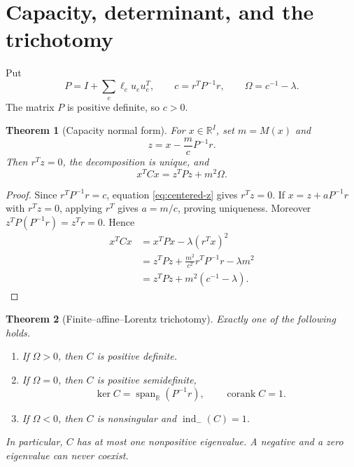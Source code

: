 \documentclass[11pt,a4paper]{amsart}
\theoremstyle{plain}
\newtheorem{theorem}{Theorem}[section]
\theoremstyle{definition}
\newcommand{\RR}{\mathbb R}
\newcommand{\corank}{\operatorname{corank}}
\newcommand{\indm}{\operatorname{ind}_{-}}
\newcommand{\spanr}{\operatorname{span}_{\RR}}
\begin{document}
\section{Capacity, determinant, and the trichotomy}\label{sec:capacity}

Put
\begin{equation}\label{eq:P-c-Omega}
 P=I+\sum_e\ell_eu_eu_e^T,\qquad
 c=r^TP^{-1}r,\qquad
 \Omega=c^{-1}-\lambda.
\end{equation}
The matrix $P$ is positive definite, so $c>0$.

\begin{theorem}[Capacity normal form]\label{thm:capacity-normal}
For $x\in\RR^I$, set $m=M(x)$ and
\begin{equation}\label{eq:centered-z}
 z=x-\frac{m}{c}P^{-1}r.
\end{equation}
Then $r^Tz=0$, the decomposition is unique, and
\begin{equation}\label{eq:capacity-completion}
 \boxed{\quad x^TCx=z^TPz+m^2\Omega.\quad}
\end{equation}
\end{theorem}

\begin{proof}
Since $r^TP^{-1}r=c$, equation \eqref{eq:centered-z} gives $r^Tz=0$.  If
$x=z+aP^{-1}r$ with $r^Tz=0$, applying $r^T$ gives $a=m/c$, proving uniqueness.  Moreover
$z^TP(P^{-1}r)=z^Tr=0$.  Hence
\begin{align*}
 x^TCx
 &=x^TPx-\lambda(r^Tx)^2\\
 &=z^TPz+\frac{m^2}{c^2}r^TP^{-1}r-\lambda m^2\\
 &=z^TPz+m^2(c^{-1}-\lambda).
\end{align*}
\end{proof}

\begin{theorem}[Finite--affine--Lorentz trichotomy]\label{thm:trichotomy}
Exactly one of the following holds.
\begin{enumerate}[label=(\roman*),leftmargin=2.2em]
\item If $\Omega>0$, then $C$ is positive definite.
\item If $\Omega=0$, then $C$ is positive semidefinite,
\[
             \ker C=\spanr(P^{-1}r),\qquad \corank C=1.
\]
\item If $\Omega<0$, then $C$ is nonsingular and $\indm(C)=1$.
\end{enumerate}
In particular, $C$ has at most one nonpositive eigenvalue.  A negative and a zero eigenvalue can
never coexist.
\end{theorem}
\end{document}
